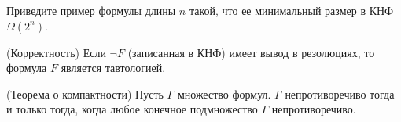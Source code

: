 \begin{ptask}{3}
    Приведите пример формулы длины $n$ такой, что ее минимальный
    размер в КНФ $\Omega(2^n)$.
\end{ptask}

\begin{ptask}{4} (Корректность)
    Если $\neg F$ (записанная в КНФ) имеет вывод в резолюциях, то
    формула $F$ является тавтологией.
\end{ptask}

\begin{ptask}{5} (Теорема о компактности)
    Пусть $\Gamma$ множество формул. $\Gamma$ непротиворечиво тогда и
    только тогда, когда любое конечное подмножество $\Gamma$ непротиворечиво.
\end{ptask}